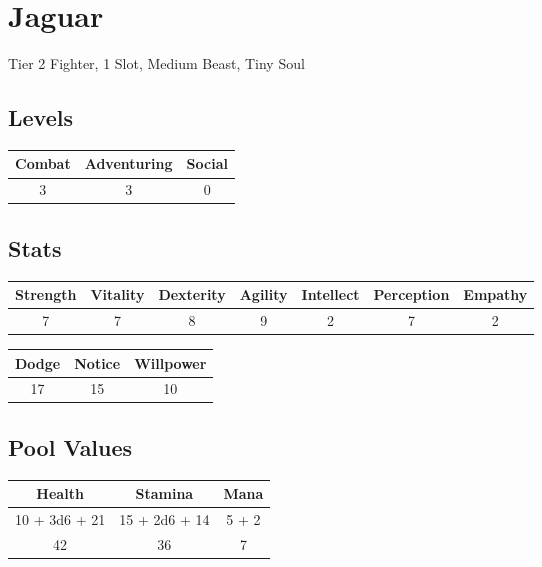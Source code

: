 \section{Jaguar}
Tier 2 Fighter, 1 Slot, Medium Beast, Tiny Soul


\subsection{Levels}
\begin{minipage}[H]{1\textwidth}
    \centering
    \begin{tabular}[c]{|c | c | c|}
        \hline
        Combat & Adventuring & Social\\
        \hline
        3 & 3 & 0\\
        \hline
    \end{tabular}
\end{minipage}

\subsection{Stats}
\begin{minipage}[H]{1\textwidth}
    \centering
    \begin{tabular}[c]{|c | c | c | c | c | c | c|}
        \hline
        Strength & Vitality & Dexterity & Agility & Intellect & Perception & Empathy\\
        \hline
        7 & 7 & 8 & 9 & 2 & 7 & 2\\
        \hline
    \end{tabular}
\end{minipage}
\bigbreak

\begin{minipage}[H]{1\textwidth}
    \centering
    \begin{tabular}[c]{|c | c | c|}
        \hline
        Dodge & Notice & Willpower\\
        \hline
        17 & 15 & 10\\
        \hline
    \end{tabular}
\end{minipage}

\subsection{Pool Values}
\bigbreak
\begin{minipage}[H]{1\textwidth}
    \centering
    \begin{tabular}[c]{|c | c | c|}
        \hline
        Health & Stamina & Mana\\
        \hline
        10 + 3d6 + 21 & 15 + 2d6 + 14 & 5 + 2 \\
        42 & 36 & 7\\
        \hline
    \end{tabular}
\end{minipage}
\noindent

